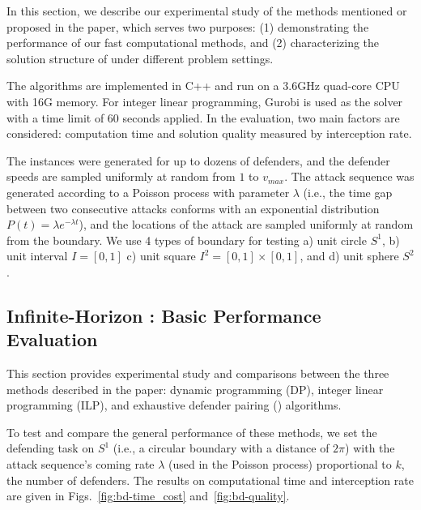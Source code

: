In this section, we describe our experimental study of the methods mentioned or proposed in the paper, which serves two purposes: (1) demonstrating the performance of our fast computational methods, and (2) characterizing the solution structure of \prob under different problem settings.
%

The algorithms are implemented in C++ and run on a 3.6GHz quad-core CPU with 16G memory.
For integer linear programming, Gurobi \cite{optimization2019gurobi} is used as the solver with a time limit of 60 seconds applied.
In the evaluation, two main factors are considered: computation time and solution quality measured by interception rate. 

The instances were generated for up to dozens of defenders, 
and the defender speeds are sampled uniformly at random from $1$ to $v_{max}$.
The attack sequence was generated according to a Poisson process with parameter $\lambda$ (i.e., the time gap between
two consecutive attacks conforms with an exponential distribution $P(t) = \lambda e^{-\lambda t}$),
and the locations of the attack are sampled uniformly at random from the boundary.
We use 4 types of boundary for testing a) unit circle $S^1$, b) unit interval $I=[0, 1]$
c) unit square $I^2=[0, 1]\times[0,1]$, and d) unit sphere $S^2$.

\subsection{Infinite-Horizon \prob: Basic Performance Evaluation}
This section provides experimental study and comparisons between the three methods described in the paper: 
dynamic programming (DP), integer linear programming (ILP), and exhaustive defender pairing (\ours) algorithms.

To test and compare the general performance of these methods, we set the defending task on $S^1$ (i.e., a circular boundary with a distance of $2\pi$) 
with the attack sequence's coming rate $\lambda$ (used in the Poisson process) proportional to $k$, the number of defenders. 
The results on computational time and interception rate are given in Figs.~\ref{fig:bd-time_cost} and~\ref{fig:bd-quality}.

